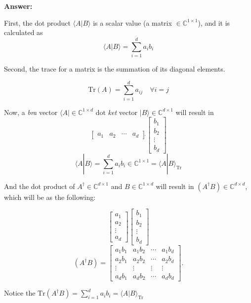 \documentclass[12pt]{article}
\renewcommand{\>}{\rangle}
\newcommand{\<}{\langle}
\newcommand{\C}{\mathbb{C}}
\begin{document}
\textbf{Answer: }

First, the dot product $\< A | B\>$ is a scalar value (a matrix  $\in\C^{1\times 1}$), and it is calculated as 
\begin{equation}
\< A | B\> =  \sum_{i=1}^d a_i b_i 
\end{equation}

Second, the trace for a matrix is the summation of its diagonal elements. 

\begin{equation}
\mathrm{Tr} (A) =  \sum_{i=1}^d a_{ij}  \quad \forall i=j 
\end{equation}

Now, a {\em bra} vector $\< A| \in\C^{1\times d}$ dot {\em ket} vector $|B\> \in\C^{d\times 1}$ will result in  
$$
\begin{bmatrix} a_1 & a_2 & \cdots & a_d \end{bmatrix} \Dot{}
\begin{bmatrix} b_1 \\ b_2 \\ \vdots \\ b_d \end{bmatrix} 
$$
$$\< A | B\> =  \sum_{i=1}^d a_i b_i  \in\C^{1\times 1} = \< A | B\>_\mathrm{Tr}$$  


And the dot product of $A^\dagger \in \C^{d\times 1}$ and $B \in \C^{1\times d}$ will result in $(A^\dagger B) \in \C^{d\times d}$, which will be as the following: 

\[
    \begin{bmatrix} a_1 \\ a_2 \\ \vdots \\ a_d \end{bmatrix} \Dot{} \begin{bmatrix} b_1 \\ b_2 \\ \vdots \\ b_d \end{bmatrix} 
\]
\[
(A^\dagger B) = \begin{bmatrix} a_1 b_1 & a_1 b_2 & \cdots & a_1 b_d \\ a_2 b_1 & a_2 b_2 & \cdots & a_2 b_d \\ \vdots & \vdots & \vdots & \vdots \\ a_d b_1 & a_d b_2 & \cdots & a_d b_d 
\end{bmatrix}. 
\]

Notice the  $\mathrm{Tr}(A^\dagger B) = \sum_{i=1}^d a_i b_i = \< A | B\>_\mathrm{Tr}$ 
\end{document}
